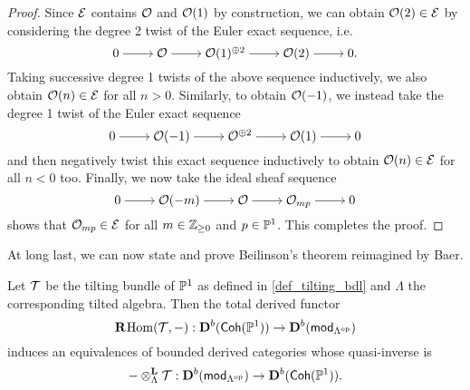 \begin{proof}
  Since $\shf{E}$ contains $\shf{O}$ and $\twist{1}$ by construction,
  we can obtain $\twist{2} \in \triangcat{E}$ by considering the
  degree 2 twist of the Euler exact sequence, i.e.
  \[
    \begin{tikzcd}[cramped]
      0 & {\shf{O}} & {\twist{1}^{\biprod 2}} & {\twist{2}} & 0.
      \arrow[from=1-1, to=1-2]
      \arrow[from=1-2, to=1-3]
      \arrow[from=1-3, to=1-4]
      \arrow[from=1-4, to=1-5]
    \end{tikzcd}
  \]
  Taking successive degree 1 twists of the above sequence
  inductively, we also obtain $\twist{n} \in \triangcat{E}$ for all $n > 0$.
  Similarly, to obtain $\twist{-1}$, we instead take the degree 1
  twist of the Euler exact sequence
  \[
    \begin{tikzcd}[cramped]
      0 & {\twist{-1}} & {\shf{O}^{\biprod 2}} & {\twist{1}} & 0
      \arrow[from=1-1, to=1-2]
      \arrow[from=1-2, to=1-3]
      \arrow[from=1-3, to=1-4]
      \arrow[from=1-4, to=1-5]
    \end{tikzcd}
  \]
  and then negatively twist this exact sequence inductively to obtain
  $\twist{n} \in \triangcat{E}$ for all $n < 0$ too.
  Finally, we now take the ideal sheaf sequence
  \[
    \begin{tikzcd}[cramped]
      0 & {\twist{-m}} & {\shf{O}} & {\skyscraper{mp}} & 0
      \arrow[from=1-1, to=1-2]
      \arrow[from=1-2, to=1-3]
      \arrow[from=1-3, to=1-4]
      \arrow[from=1-4, to=1-5]
    \end{tikzcd}
  \]
  shows that $\skyscraper{mp} \in \triangcat{E}$ for all $m \in
  \zpos$ and $p \in \proj{1}$.
  This completes the proof.
\end{proof}

At long last, we can now state and prove Beilinson's theorem reimagined by Baer.

\begin{theorem}
  Let $\shf{T}$ be the tilting bundle of $\proj{1}$ as defined in
  \cref{def_tilting_bdl} and $\Lambda$ the corresponding tilted algebra.
  Then the total derived functor
  \[
    \rightderfunc{\Hom(\shf{T}, -)}: \dercat[b]{\Coh(\proj{1})} \to
    \dercat[b]{\mod{\op{\Lambda}}}
  \]
  induces an equivalences of bounded derived categories whose quasi-inverse is
  \[
    \dertensor{\Lambda}{-}{\shf{T}}: \dercat[b]{\mod{\op{\Lambda}}}
    \to \dercat[b]{\Coh(\proj{1})}.
  \]
  \vspace{-30pt}
\end{theorem}

